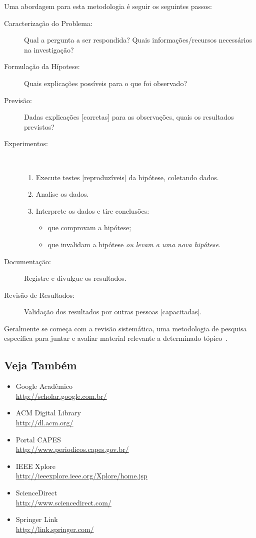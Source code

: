 Uma abordagem para esta metodologia é seguir os seguintes passos:
\begin{description}
	\item[Caracterização do Problema:] Qual a pergunta a ser respondida? Quais
informações/recursos necessários na investigação?
	\item[Formulação da Hípotese:] Quais explicações possíveis para o que foi observado?
	\item[Previsão:] Dadas explicações [corretas] para as observações, quais os
	resultados previstos?
	\item[Experimentos:] \ \\\vspace{-2em}
		\begin{enumerate}
			\item Execute testes [reproduzíveis] da hipótese, coletando dados.
			\item Analise os dados.
			\item Interprete os dados e tire conclusões:
				\begin{itemize}
				\item que comprovam a hipótese;
				\item que invalidam a hipótese \emph{ou levam a uma nova hipótese}.
				\end{itemize}
		\end{enumerate}
	\item[Documentação:] Registre e divulgue os resultados.
	\item[Revisão de Resultados:] Validação dos resultados por outras pessoas
	[capacitadas].
\end{description}%

Geralmente se começa com a revisão sistemática, uma metodologia de pesquisa
específica para juntar e avaliar material relevante a determinado tópico~\cite{Biolchini_2005_Systematicreviewin}.

\subsection{Veja Também}
\begin{itemize}
	\item Google Acadêmico
		\\\url{http://scholar.google.com.br/}%
	\item ACM Digital Library
		\\\url{http://dl.acm.org/}%
	\item Portal \acrshort{CAPES}
		\\\url{http://www.periodicos.capes.gov.br/}%
	\item IEEE Xplore
		\\\url{http://ieeexplore.ieee.org/Xplore/home.jsp}%
	\item ScienceDirect
		\\\url{http://www.sciencedirect.com/}%
	\item Springer Link
		\\\url{http://link.springer.com/}%
\end{itemize}

